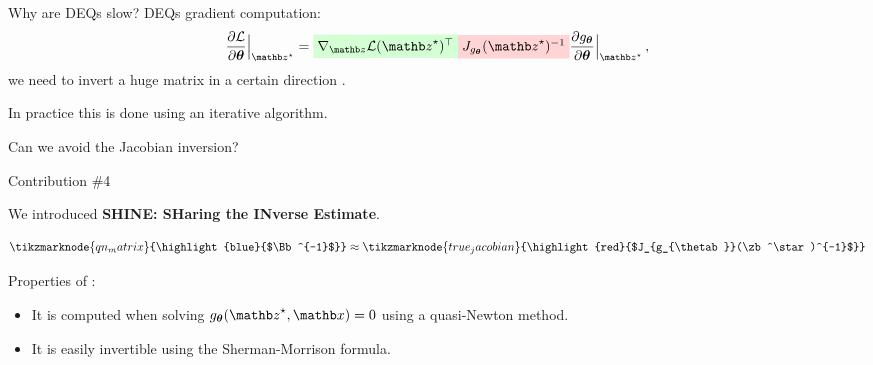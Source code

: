 \begin{frame}{Why are DEQs slow?}
    DEQs gradient computation:
    \begin{equation*}
        \frac{\partial \mathcal{L}}{\partial \thetab}\Bigr|_{\zb^\star} = \highlight{green}{$\nabla_\zb \mathcal{L}(\zb^\star)^\top$} \highlight{red}{$J_{g_{\thetab}}(\zb^\star)^{-1}$} \frac{\partial g_{\thetab}}{\partial \thetab}\Bigr|_{\zb^\star} \, ,
    \end{equation*}
    we need to invert a huge matrix  in a certain direction .
    \pause

    In practice this is done using an iterative algorithm.
\end{frame}

\begin{frame}{Can we avoid the Jacobian inversion?}
    \begin{exampleblock}{Contribution \#4}
    \end{exampleblock}

    We introduced \textbf{SHINE: SHaring the INverse Estimate}.

    \begin{equation*}
        \tikzmarknode{qn_matrix}{\highlight{blue}{$\Bb^{-1}$}} \approx \tikzmarknode{true_jacobian}{\highlight{red}{$J_{g_{\thetab}}(\zb^\star)^{-1}$}}
    \end{equation*}

    \pause

    \hfill \break
    Properties of :
    \begin{itemize}
        \item<4-> It is computed when solving $g_\thetab(\zb^\star, \xb) = 0$ using a quasi-Newton method.
        \item<5-> It is easily invertible using the Sherman-Morrison formula.
    \end{itemize}
\end{frame}

